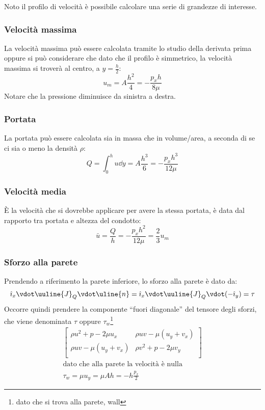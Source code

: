 %
Noto il profilo di velocità è possibile calcolare una serie di grandezze di interesse.

\subsubsection{Velocità massima}
La velocità massima può essere calcolata tramite lo studio della derivata prima oppure si può considerare che dato che il profilo è simmetrico, la velocità massima si troverà al centro, a $y = \frac{h}{2}$:
%
	\begin{equation*}
		u_m = A \frac{h^2}{4} = - \frac{p_x h}{8 \mu}
	\end{equation*}
%
Notare che la pressione diminuisce da sinistra a destra.

\subsubsection{Portata}
La portata può essere calcolata sia in massa che in volume/area, a seconda di se ci sia o meno la densità $\rho$:
%
	\begin{equation*}
		Q = \int_0^h u \dd{y} = A \frac{h^3}{6} = - \frac{p_x h^3}{12 \mu}
	\end{equation*}
%

\subsubsection{Velocità media}
È la velocità che si dovrebbe applicare per avere la stessa portata, è data dal rapporto tra portata e altezza del condotto:
%
	\begin{equation*}
		\bar{u} = \frac{Q}{h} = - \frac{p_x h^2}{12 \mu} = \frac{2}{3} u_m
	\end{equation*}
%

\subsubsection{Sforzo alla parete}
Prendendo a riferimento la parete inferiore, lo sforzo alla parete è dato da:
%
	\begin{equation*}
		\hat{\imath}_x \vdot \uuline{J}_Q \vdot \uline{n} = \hat{\imath}_x \vdot \uuline{J}_Q \vdot (- \hat{\imath}_y) = \tau
	\end{equation*}
%	
Occorre quindi prendere la componente ``fuori diagonale'' del tensore degli sforzi, che viene denominata $\tau$ oppure $\tau_w$\footnote{dato che si trova alla parete, wall}
%
	\begin{equation*}
		\begin{gathered}
			\begin{bmatrix}
				\rho u^2 + p - 2 \mu u_x & \rho u v - \mu (u_y + v_x)\\
				\rho u v - \mu (u_y + v_x) & \rho v^2 + p - 2 \mu v_y\\
			\end{bmatrix}\\
			\text{dato che alla parete la velocità è nulla}\\
			\tau_w = \mu u_y = \mu A h = - h \frac{p_x}{2}
		\end{gathered}
	\end{equation*}
%

